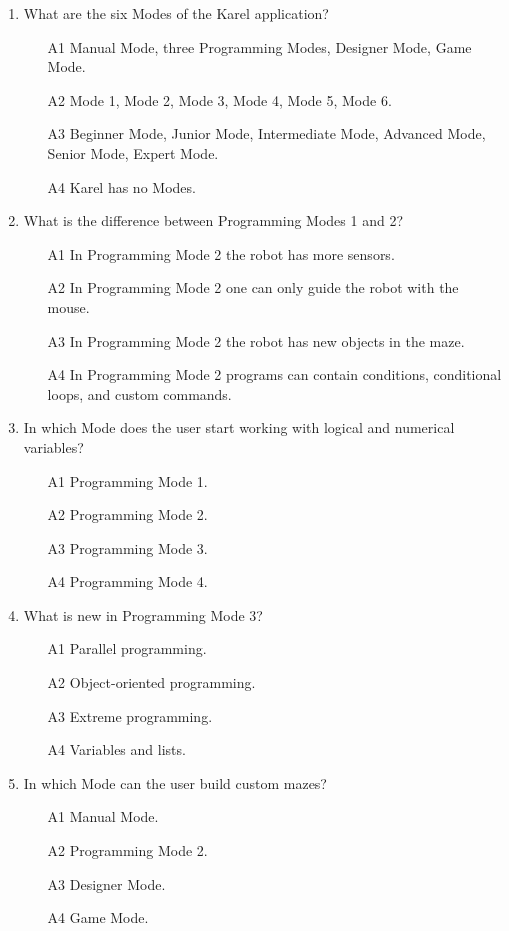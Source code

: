 \begin{enumerate}
\item What are the six Modes of the Karel application?
\begin{enumerate}
\item[A1] Manual Mode, three Programming Modes, Designer Mode, Game Mode.
\item[A2] Mode 1, Mode 2, Mode 3, Mode 4, Mode 5, Mode 6.
\item[A3] Beginner Mode, Junior Mode, Intermediate Mode, Advanced Mode, Senior Mode, Expert Mode.
\item[A4] Karel has no Modes.
\end{enumerate}
\item What is the difference between Programming Modes 1 and 2?
\begin{enumerate}
\item[A1] In Programming Mode 2 the robot has more sensors. 
\item[A2] In Programming Mode 2 one can only guide the robot with the mouse.
\item[A3] In Programming Mode 2 the robot has new objects in the maze.
\item[A4] In Programming Mode 2 programs can contain conditions, conditional loops, and custom commands. 
\end{enumerate}
\item In which Mode does the user start working with logical and numerical variables?
\begin{enumerate}
\item[A1] Programming Mode 1.
\item[A2] Programming Mode 2.
\item[A3] Programming Mode 3.
\item[A4] Programming Mode 4.
\end{enumerate}
\item What is new in Programming Mode 3?
\begin{enumerate}
\item[A1] Parallel programming.
\item[A2] Object-oriented programming.
\item[A3] Extreme programming.
\item[A4] Variables and lists.
\end{enumerate}
\item In which Mode can the user build custom mazes?
\begin{enumerate}
\item[A1] Manual Mode.
\item[A2] Programming Mode 2.
\item[A3] Designer Mode.
\item[A4] Game Mode.
\end{enumerate}
\end{enumerate}

